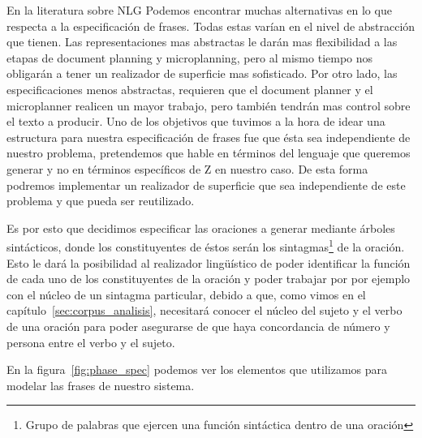 En la literatura sobre NLG Podemos encontrar muchas alternativas en lo que respecta a la especificación de frases. Todas estas varían en el nivel de abstracción que tienen. Las representaciones mas abstractas le darán mas flexibilidad a las etapas de document planning y microplanning, pero al mismo tiempo nos obligarán a tener un realizador de superficie mas sofisticado. Por otro lado, las especificaciones menos abstractas, requieren que el document planner y el microplanner realicen un mayor trabajo, pero también tendrán mas control sobre el texto a producir. Uno de los objetivos que tuvimos a la hora de idear una estructura para nuestra especificación de frases fue que ésta sea independiente de nuestro problema, pretendemos que hable en términos del lenguaje que queremos generar y no en términos específicos de Z en nuestro caso. De esta forma podremos implementar un realizador de superficie que sea independiente de este problema y que pueda ser reutilizado. %


Es por esto que decidimos especificar las oraciones a generar mediante árboles sintácticos, donde los constituyentes de éstos serán los sintagmas\footnote{Grupo de palabras que ejercen una función sintáctica dentro de una oración} de la oración. Esto le dará la posibilidad al realizador lingüístico de poder identificar la función de cada uno de los constituyentes de la oración y poder trabajar por por ejemplo con el núcleo de un sintagma particular, debido a que, como vimos en el capítulo~\ref{sec:corpus_analisis}, necesitará conocer el núcleo del sujeto y el verbo de una oración para poder asegurarse de que haya concordancia de número y persona entre el verbo y el sujeto. 

En la figura~\ref{fig:phase_spec} podemos ver los elementos que utilizamos para modelar las frases de nuestro sistema.

